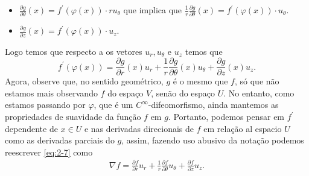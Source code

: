 \begin{homeworkProblem}[Seção 2-7]
\begin{solution}
\begin{itemize}
      \item $\frac{\partial g}{\partial \theta}(x)=f^{\prime}(\varphi(x))\cdot ru_\theta$ que implica que $\frac{1}{r}\frac{\partial g}{\partial \theta}(x)=f^{\prime}(\varphi(x))\cdot u_{\theta}$.
      \item $\frac{\partial g}{\partial z}(x)=f^{\prime}(\varphi(x))\cdot u_{z}$.
    \end{itemize}
    Logo temos que respecto a os vetores $u_r,u_\theta$ e $u_z$ temos que
    \begin{equation}\label{eq:2-7}
      f^{\prime}(\varphi(x))=\frac{\partial g}{\partial r}(x)u_r+\frac{1}{r}\frac{\partial g}{\partial \theta}(x)u_{\theta}+\frac{\partial g}{\partial z}(x)u_z.
    \end{equation}
    Agora, observe que, no sentido geométrico, $g$ é o mesmo que $f$, só que não estamos mais observando $f$ do espaço $V$, senão do espaço $U$. No entanto, como estamos passando por $\varphi$, que é um $C^{\infty}$-difeomorfismo, ainda mantemos as propriedades de suavidade da função $f$ em $g$. Portanto, podemos pensar em $f^{\prime}$ dependente de $x\in U$ e nas derivadas direcionais de $f$ em relação al espacio $U$ como as derivadas parciais do $g$, assim, fazendo uso abusivo da notação podemos reescrever \eqref{eq:2-7} como
    \begin{align*}
      \nabla f=\frac{\partial f}{\partial r}u_r+\frac{1}{r}\frac{\partial f}{\partial \theta}u_\theta+\frac{\partial f}{\partial z}u_{z}.
    \end{align*}
  \end{solution}
\end{homeworkProblem}
